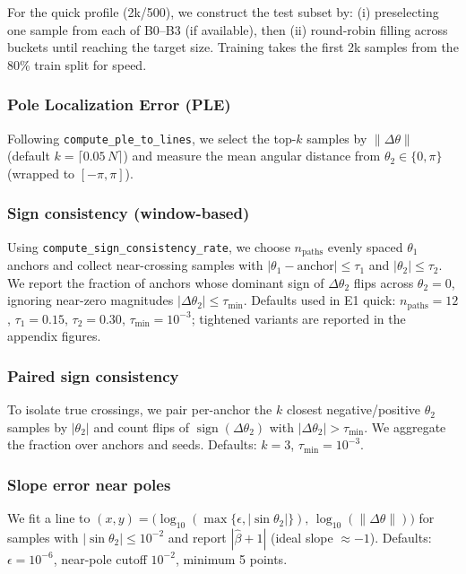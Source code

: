 \documentclass[11pt,twoside]{article}
\begin{document}
For the quick profile (2k/500), we construct the test subset by: (i) preselecting one sample from each of B0--B3 (if available), then (ii) round-robin filling across buckets until reaching the target size. Training takes the first 2k samples from the 80\% train split for speed.

\subsubsection{Pole Localization Error (PLE)}

Following \texttt{compute\_ple\_to\_lines}, we select the top-$k$ samples by $\|\Delta\theta\|$ (default $k=\lceil 0.05\,N\rceil$) and measure the mean angular distance from $\theta_2\in\{0,\pi\}$ (wrapped to $[-\pi,\pi]$).

\subsubsection{Sign consistency (window-based)}

Using \texttt{compute\_sign\_consistency\_rate}, we choose $n_\mathrm{paths}$ evenly spaced $\theta_1$ anchors and collect near-crossing samples with $|\theta_1-\text{anchor}|\le\tau_1$ and $|\theta_2|\le\tau_2$. We report the fraction of anchors whose dominant sign of $\Delta\theta_2$ flips across $\theta_2=0$, ignoring near-zero magnitudes $|\Delta\theta_2|\le\tau_\mathrm{min}$. Defaults used in E1 quick: $n_\mathrm{paths}=12$, $\tau_1=0.15$, $\tau_2=0.30$, $\tau_\mathrm{min}=10^{-3}$; tightened variants are reported in the appendix figures.

\subsubsection{Paired sign consistency}

To isolate true crossings, we pair per-anchor the $k$ closest negative/positive $\theta_2$ samples by $|\theta_2|$ and count flips of $\operatorname{sign}(\Delta\theta_2)$ with $|\Delta\theta_2|>\tau_\mathrm{min}$. We aggregate the fraction over anchors and seeds. Defaults: $k=3$, $\tau_\mathrm{min}=10^{-3}$.

\subsubsection{Slope error near poles}

We fit a line to $(x,y)=\big(\log_{10}(\max\{\epsilon,|\sin\theta_2|\}),\,\log_{10}(\|\Delta\theta\|)\big)$ for samples with $|\sin\theta_2|\le 10^{-2}$ and report $|\hat{\beta}+1|$ (ideal slope $\approx-1$). Defaults: $\epsilon=10^{-6}$, near-pole cutoff $10^{-2}$, minimum 5 points.
\end{document}
